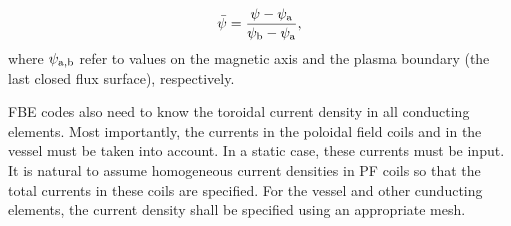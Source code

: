 \begin{equation}
\bar \psi  = \frac{{\psi  - {\psi _{\rm{a}}}}}{{{\psi _{\rm{b}}} - {\psi _{\rm{a}}}}},
\end{equation}
where $\psi _{\rm{a,b}}$ refer to values on the magnetic axis and the plasma boundary (the last closed flux surface), respectively.

FBE codes also need to know the toroidal current density in all conducting elements. Most importantly, the currents in the poloidal field coils and in the vessel must be taken into account. In a static case, these currents must be input. It is natural to assume homogeneous current densities in PF coils so that the total currents in these coils are specified. For the vessel and other cunducting elements, the current density shall be specified using an appropriate mesh.
